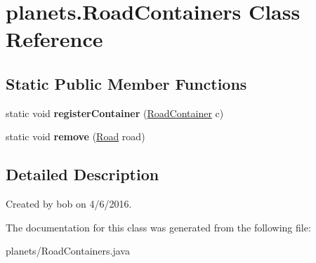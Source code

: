 \hypertarget{classplanets_1_1_road_containers}{}\section{planets.\+Road\+Containers Class Reference}
\label{classplanets_1_1_road_containers}
\subsection*{Static Public Member Functions}
\begin{DoxyCompactItemize}
\item 
static void {\bfseries register\+Container} (\hyperlink{interfaceplanets_1_1_road_container}{Road\+Container} c)\hypertarget{classplanets_1_1_road_containers_a024630e50b505db241c77c5e0ce59c51}{}\label{classplanets_1_1_road_containers_a024630e50b505db241c77c5e0ce59c51}

\item 
static void {\bfseries remove} (\hyperlink{classplanets_1_1_road}{Road} road)\hypertarget{classplanets_1_1_road_containers_a8782b009875935cc17afa7daee1fbaff}{}\label{classplanets_1_1_road_containers_a8782b009875935cc17afa7daee1fbaff}

\end{DoxyCompactItemize}


\subsection{Detailed Description}
Created by bob on 4/6/2016. 

The documentation for this class was generated from the following file\+:\begin{DoxyCompactItemize}
\item 
planets/Road\+Containers.\+java\end{DoxyCompactItemize}
